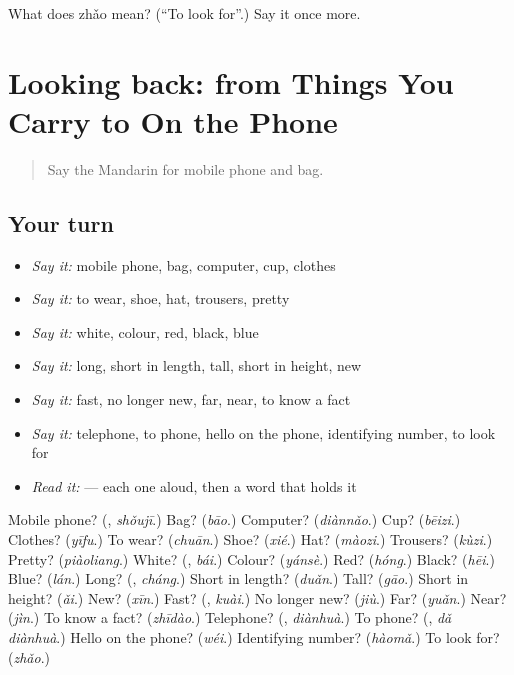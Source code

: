 \begin{tcolorbox}[breakable,colback=teal!4,colframe=teal!35!black,title={Before you move on}]
What does zhǎo mean? (\textquotedblleft{}To look for\textquotedblright{}.) Say it once more.
\end{tcolorbox}
\section[(dialogue)]{Looking back: from Things You Carry to On the Phone}

\label{lesson:ZH-R63-review-58-63}



\begin{quote}
Say the Mandarin for mobile phone and bag.
\end{quote}

\subsection*{Your turn}
\begin{itemize}
\raggedright
  \item \emph{Say it:} mobile phone, bag, computer, cup, clothes
  \item \emph{Say it:} to wear, shoe, hat, trousers, pretty
  \item \emph{Say it:} white, colour, red, black, blue
  \item \emph{Say it:} long, short in length, tall, short in height, new
  \item \emph{Say it:} fast, no longer new, far, near, to know a fact
  \item \emph{Say it:} telephone, to phone, hello on the phone, identifying number, to look for
  \item \emph{Read it:}       — each one aloud, then a word that holds it
\end{itemize}

\begin{tcolorbox}[breakable,colback=teal!4,colframe=teal!35!black,title={Before you move on}]
Mobile phone? (\textbf{}, \emph{shǒujī}.) Bag? (\emph{bāo}.) Computer? (\emph{diànnǎo}.) Cup? (\emph{bēizi}.) Clothes? (\emph{yīfu}.) To wear? (\emph{chuān}.) Shoe? (\emph{xié}.) Hat? (\emph{màozi}.) Trousers? (\emph{kùzi}.) Pretty? (\emph{piàoliang}.) White? (\textbf{}, \emph{bái}.) Colour? (\emph{yánsè}.) Red? (\emph{hóng}.) Black? (\emph{hēi}.) Blue? (\emph{lán}.) Long? (\textbf{}, \emph{cháng}.) Short in length? (\emph{duǎn}.) Tall? (\emph{gāo}.) Short in height? (\emph{ǎi}.) New? (\emph{xīn}.) Fast? (\textbf{}, \emph{kuài}.) No longer new? (\emph{jiù}.) Far? (\emph{yuǎn}.) Near? (\emph{jìn}.) To know a fact? (\emph{zhīdào}.) Telephone? (\textbf{}, \emph{diànhuà}.) To phone? (\textbf{}, \emph{dǎ diànhuà}.) Hello on the phone? (\emph{wéi}.) Identifying number? (\emph{hàomǎ}.) To look for? (\emph{zhǎo}.)
\end{tcolorbox}
